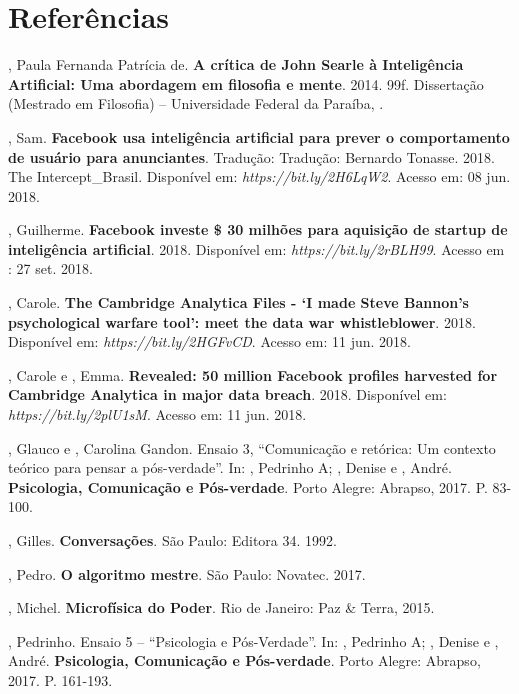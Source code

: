 \section{Referências}

, Paula Fernanda Patrícia de. \textbf{A crítica de John Searle à
Inteligência Artificial: Uma abordagem em filosofia e mente}.
2014. 99f. Dissertação (Mestrado em Filosofia) -- Universidade Federal
da Paraíba, .

, Sam. \textbf{Facebook usa inteligência artificial para prever o
comportamento de usuário para anunciantes}. Tradução: Tradução: Bernardo
Tonasse. 2018. The Intercept\_Brasil. Disponível em:
\emph{https://bit.ly/2H6LqW2}. Acesso em: 08 jun. 2018.

, Guilherme. \textbf{Facebook investe \$ 30 milhões para
aquisição de startup de inteligência artificial}. 2018. Disponível em:
\emph{https://bit.ly/2rBLH99}. Acesso em : 27 set. 2018.

, Carole. \textbf{The Cambridge Analytica Files - `I made
Steve Bannon's psychological warfare tool': meet the data war
whistleblower}. 2018. Disponível em: \emph{https://bit.ly/2HGFvCD}.
Acesso em: 11 jun. 2018.

, Carole e , Emma. \textbf{Revealed: 50 million
Facebook profiles harvested for Cambridge Analytica in major data
breach}. 2018. Disponível em: \emph{https://bit.ly/2plU1sM}. Acesso em: 11 jun. 2018.

, Glauco e , Carolina Gandon. Ensaio 3, ``Comunicação e
retórica: Um contexto teórico para pensar a pós-verdade''. In:
, Pedrinho A; , Denise e , André. \textbf{Psicologia,
Comunicação e Pós-verdade}. Porto Alegre: Abrapso, 2017. P. 83-100.

, Gilles. \textbf{Conversações}. São Paulo: Editora 34. 1992.

, Pedro. \textbf{O algoritmo mestre}. São Paulo: Novatec. 2017.

, Michel. \textbf{Microfísica do Poder}. Rio de Janeiro: Paz \&
Terra, 2015.

, Pedrinho. Ensaio 5 -- ``Psicologia e Pós-Verdade''. In:
, Pedrinho A; , Denise e , André. \textbf{Psicologia,
Comunicação e Pós-verdade}. Porto Alegre: Abrapso, 2017. P. 161-193.

